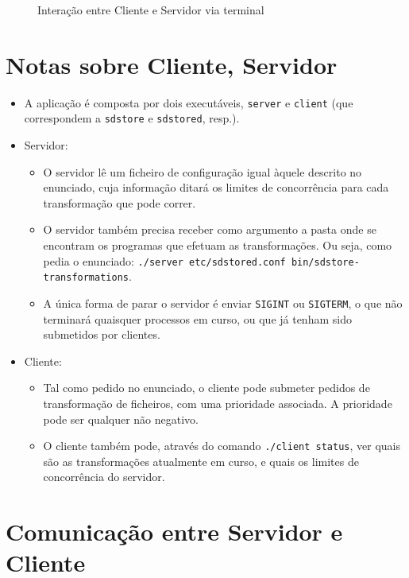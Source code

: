 \documentclass[11pt,a4paper]{report}%
\begin{document}
\begin{figure}
  \centering
  
  \caption{Interação entre Cliente e Servidor via terminal}
\end{figure}

\newpage

\section{Notas sobre Cliente, Servidor}

\begin{itemize}
  \item A aplicação é composta por dois executáveis, \texttt{server} e \texttt{client}
  (que correspondem a \texttt{sdstore} e \texttt{sdstored}, resp.).
  \item Servidor:
  \begin{itemize}
    \item O servidor lê um ficheiro de configuração igual àquele descrito no enunciado,
    cuja informação ditará os limites de concorrência para cada transformação que pode correr.
    \item O servidor também precisa receber como argumento a pasta onde se encontram
    os programas que efetuam as transformações. Ou seja, como pedia o enunciado:
    \texttt{./server etc/sdstored.conf bin/sdstore-transformations}.
    \item A única forma de parar o servidor é enviar \texttt{SIGINT} ou \texttt{SIGTERM},
    o que não terminará quaisquer processos em curso, ou que já tenham sido submetidos por clientes.
  \end{itemize}

  \item Cliente:
  \begin{itemize}
    \item Tal como pedido no enunciado, o cliente pode submeter pedidos de transformação
    de ficheiros, com uma prioridade associada. A prioridade pode ser qualquer não negativo.
    \item O cliente também pode, através do comando \texttt{./client status}, ver quais são as
    transformações atualmente em curso, e quais os limites de concorrência do servidor.
  \end{itemize}
\end{itemize}

\section{Comunicação entre Servidor e Cliente}
\end{document}

